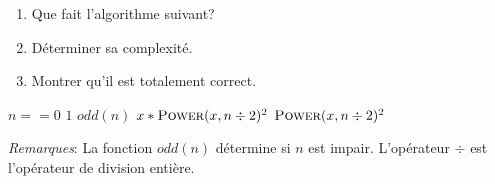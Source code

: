 \documentclass[a4paper,10pt]{article}
\begin{document}
\begin{enumerate}
\item Que fait l'algorithme suivant?
\item Déterminer sa complexité.
\item Montrer qu'il est totalement correct.
\end{enumerate}

\begin{codebox}
    \li \If $n == 0$
    \li \Then   \Return $1$
    \li \ElseIf $odd(n)$
    \li \Then   \Return $x * \textsc{Power}(x, n \div 2)^2$
    \li \Else
    \li \Return $\textsc{Power}(x, n \div 2)^2$
        \End
\end{codebox}
\vspace{10pt}

\textit{Remarques}: La fonction $odd(n)$ détermine si $n$ est impair. L'opérateur $\div$ est l'opérateur de division entière.


\end{document}
